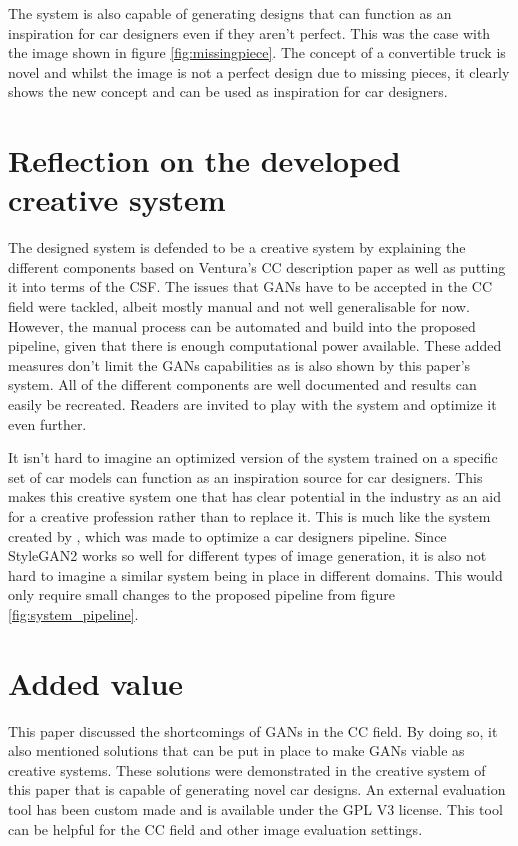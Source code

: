 The system is also capable of generating designs that can function as an inspiration for car designers even if they aren't perfect.
This was the case with the image shown in figure \ref{fig:missingpiece}.
The concept of a convertible truck is novel and whilst the image is not a perfect design due to missing pieces, it clearly shows the new concept and can be used as inspiration for car designers.




\section{Reflection on the developed creative system}
\label{sec:reflection_system}

The designed system is defended to be a creative system by explaining the different components based on Ventura's CC description paper as well as putting it into terms of the CSF.
The issues that GANs have to be accepted in the CC field were tackled, albeit mostly manual and not well generalisable for now.
However, the manual process can be automated and build into the proposed pipeline, given that there is enough computational power available.
These added measures don't limit the GANs capabilities as is also shown by this paper's system.
All of the different components are well documented and results can easily be recreated.
Readers are invited to play with the system and optimize it even further.

It isn't hard to imagine an optimized version of the system trained on a specific set of car models can function as an inspiration source for car designers.
This makes this creative system one that has clear potential in the industry as an aid for a creative profession rather than to replace it.
This is much like the system created by \citet{creativecargan}, which was made to optimize a car designers pipeline.
Since StyleGAN2 works so well for different types of image generation, it is also not hard to imagine a similar system being in place in different domains.
This would only require small changes to the proposed pipeline from figure \ref{fig:system_pipeline}.


\section{Added value}
\label{sec:added_value}

This paper discussed the shortcomings of GANs in the CC field.
By doing so, it also mentioned solutions that can be put in place to make GANs viable as creative systems.
These solutions were demonstrated in the creative system of this paper that is capable of generating novel car designs.
An external evaluation tool has been custom made and is available under the GPL V3 license.
This tool can be helpful for the CC field and other image evaluation settings. 


